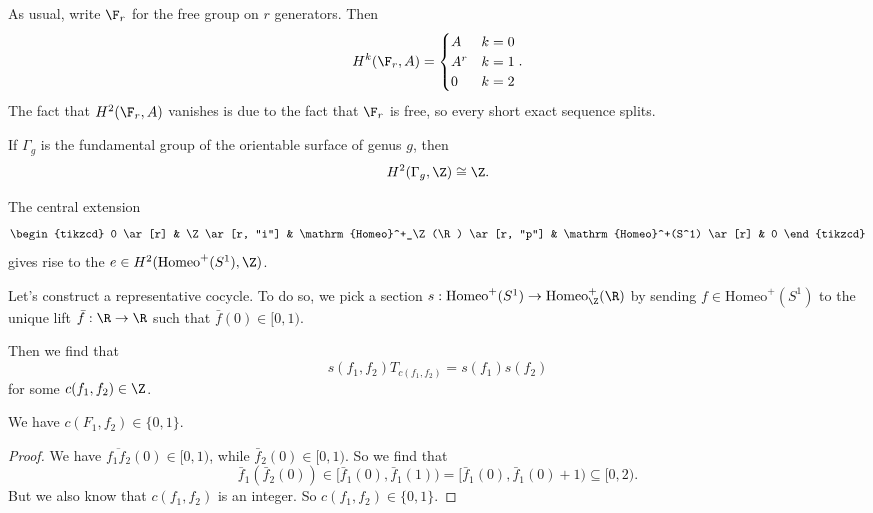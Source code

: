 \documentclass[a4paper]{article}
\newcommand\Homeo{\mathrm{Homeo}}
\begin{document}
\begin{eg}
  As usual, write $\F_r$ for the free group on $r$ generators. Then
  \begin{align*}
    H^k(\F_r, A) =
    \begin{cases}
      A & k = 0\\
      A^r & k = 1\\
      0 & k = 2
    \end{cases}.
  \end{align*}
  The fact that $H^2(\F_r, A)$ vanishes is due to the fact that $\F_r$ is free, so every short exact sequence splits.
\end{eg}

\begin{eg}
  If $\Gamma_g$ is the fundamental group of the orientable surface of genus $g$, then
  \[
    H^2 (\Gamma_g, \Z) \cong \Z.
  \]
\end{eg}

\begin{eg}
  The central extension
  \[
    \begin{tikzcd}
      0 \ar[r] & \Z \ar[r, "i"] & \Homeo^+_\Z(\R) \ar[r, "p"] & \Homeo^+(S^1) \ar[r] & 0
    \end{tikzcd}
  \]
  gives rise to the  $e \in H^2(\Homeo^+(S^1), \Z)$.

  Let's construct a representative cocycle. To do so, we pick a section $s: \Homeo^+(S^1) \to \Homeo_\Z^+(\R)$ by sending $f \in \Homeo^+(S^1)$ to the unique lift $\bar{f}: \R \to \R$ such that $\bar{f}(0) \in [0, 1)$.

  Then we find that
  \[
    s(f_1, f_2) T_{c(f_1, f_2)} = s(f_1) s(f_2)
  \]
  for some $c(f_1, f_2) \in \Z$.
\end{eg}

\begin{lemma}
  We have $c(F_1, f_2) \in \{0, 1\}$.
\end{lemma}

\begin{proof}
  We have $\overline{f_1 f_2}(0) \in [0, 1)$, while $\bar{f}_2(0) \in [0, 1)$. So we find that
  \[
    \bar{f}_1(\bar{f}_2(0)) \in [\bar{f}_1(0), \bar{f}_1(1)) = [\bar{f}_1(0), \bar{f}_1(0) + 1) \subseteq [0, 2).
  \]
  But we also know that $c(f_1, f_2)$ is an integer. So $c(f_1, f_2) \in \{0, 1\}$.
\end{proof}
\end{document}
